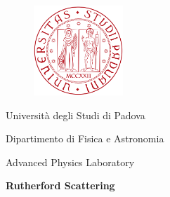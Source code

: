 \begin{titlepage} %

	\centering %


	\vspace*{\baselineskip}
    \begin{figure}[!h]
		\centering
		\includegraphics[width=0.3\textwidth]{../titlepage/images/UNIPD.png}
	\end{figure}
    \vspace*{\baselineskip}

    {\Large Università degli Studi di Padova}

    \vspace*{2mm}
    {\Large Dipartimento di Fisica e Astronomia}



    \vspace*{2cm}
    {\Large Advanced Physics Laboratory}

    \vspace*{2mm}
	\textbf{\LARGE Rutherford Scattering} %

	\vspace{0.75\baselineskip} %



    \vfill %


\end{titlepage}
